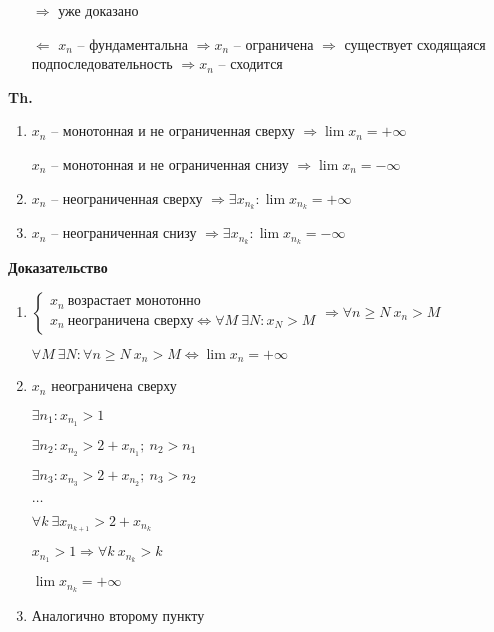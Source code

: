 \documentclass[14pt, letter paper]{article}
\begin{document}
\begin{itemize}
    \item[$\Rightarrow$] уже доказано
    \item[$\Leftarrow$] $x_n$ -- фундаментальна $\Rightarrow x_n$ -- ограничена $\Rightarrow$ существует сходящаяся подпоследовательность $\Rightarrow x_n$ -- сходится
\end{itemize}

\textbf{Th.}

\begin{enumerate}
    \item $x_n$ -- монотонная и не ограниченная сверху $\Rightarrow \lim{x_n} = + \infty$

    $x_n$ -- монотонная и не ограниченная снизу $\Rightarrow \lim{x_n} = - \infty$

    \item $x_n$ -- неограниченная сверху $\Rightarrow \exists x_{n_k} : \lim{x_{n_k}} = + \infty$

    \item $x_n$ -- неограниченная снизу $\Rightarrow \exists x_{n_k} : \lim{x_{n_k}} = - \infty$
\end{enumerate}

\begin{center}
    \textbf{Доказательство}
\end{center}

\begin{enumerate}
    \item $\begin{cases}
        x_n\ \text{возрастает монотонно} \\
        x_n\ \text{неограничена сверху} \Leftrightarrow \forall M\ \exists N : x_N > M
    \end{cases} \Rightarrow \forall n \geq N\ x_n > M$

    $\forall M\ \exists N : \forall n \geq N\ x_n > M \Leftrightarrow \lim{x_n} = + \infty$

    \item $x_n$ неограничена сверху

    $\exists n_1 : x_{n_1} > 1$

    $\exists n_2 : x_{n_2} > 2 + x_{n_1};\ n_2 > n_1$

    $\exists n_3 : x_{n_3} > 2 + x_{n_2};\ n_3 > n_2$

    $\ldots$

    $\forall k\ \exists x_{n_{k+1}} > 2 + x_{n_k}$

    $x_{n_1} > 1 \Rightarrow \forall k\ x_{n_k} > k$

    $\lim{x_{n_k}} = + \infty$

    \item Аналогично второму пункту
\end{enumerate}
\end{document}
